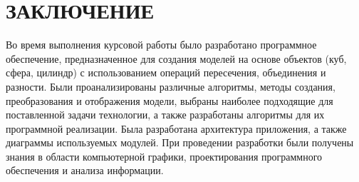 \section*{ЗАКЛЮЧЕНИЕ}
Во  время  выполнения  курсовой работы  было  разработано  программное обеспечение, предназначенное для создания моделей на основе объектов (куб, 
сфера, цилиндр) с использованием операций пересечения, объединения и 
разности.  
Были  проанализированы  различные  алгоритмы,  методы  создания, 
преобразования  и  отображения  модели,  выбраны  наиболее  подходящие  для поставленной  задачи  технологии,  а  также  разработаны  алгоритмы  для  их 
программной реализации. 
Была разработана архитектура приложения, а также 
диаграммы используемых модулей. 
При проведении разработки были получены знания  в  области  компьютерной  графики,  проектирования  программного обеспечения и анализа информации.
\pagebreak